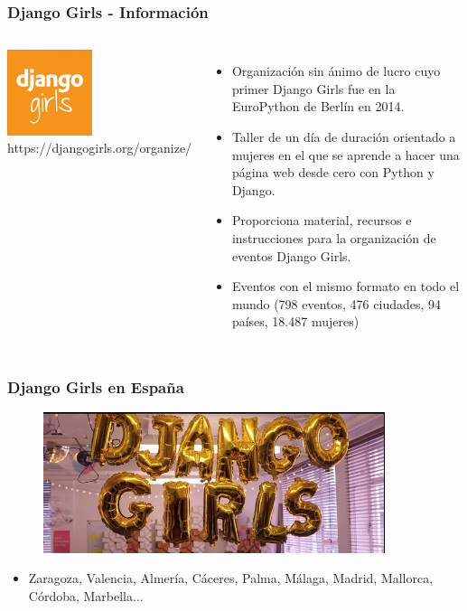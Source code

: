 \documentclass[18pt]{beamer}
\begin{document}
\begin{frame}

	\frametitle{Django Girls - Información}
		
	\begin{columns}
		\centering
			\includegraphics[width=2.5cm]{images/django_girls.jpg}\\
			\vspace{0.5cm}			
			\scriptsize https://djangogirls.org/organize/
			
		\begin{itemize}
			\setlength\itemsep{0.6em}		
			\item Organización sin ánimo de lucro cuyo primer Django Girls fue en la 
			EuroPython de Berlín en 2014.
			\item Taller de un día de duración orientado a mujeres en el que se aprende 
			a hacer una página web desde cero con Python y Django.			
			\item Proporciona material, recursos e instrucciones para la organización 
			de eventos Django Girls.
			\item Eventos con el mismo formato en todo el mundo (798 eventos, 
			476 ciudades, 94 países, 18.487 mujeres)

		\end{itemize}
	\end{columns}
	
\end{frame}


\begin{frame}

	\frametitle{Django Girls en España}
		
	\begin{figure}
		\includegraphics[width=10cm]{images/django_girls_letters.png}
	\end{figure}
	
	\begin{itemize}	
		\setlength\itemsep{0.6em}
		\item Zaragoza, Valencia, Almería, Cáceres, Palma, Málaga, Madrid, Mallorca, 
		Córdoba, Marbella... 
	\end{itemize}
	
\end{frame}
\end{document}
